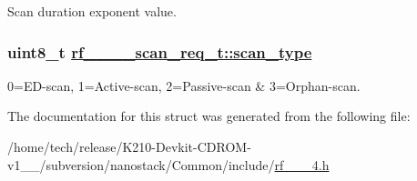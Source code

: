 Scan duration exponent value. \hypertarget{structrf__802__15__4__scan__req__t_a1bd396edfc7bc51c6eaf706c95180a1}{
\subsubsection[scan\_\-type]{\setlength{\rightskip}{0pt plus 5cm}uint8\_\-t \hyperlink{structrf__802__15__4__scan__req__t_a1bd396edfc7bc51c6eaf706c95180a1}{rf\_\_\_\_\-scan\_\-req\_\-t::scan\_\-type}}}
\label{structrf__802__15__4__scan__req__t_a1bd396edfc7bc51c6eaf706c95180a1}


0=ED-scan, 1=Active-scan, 2=Passive-scan \& 3=Orphan-scan. 

The documentation for this struct was generated from the following file:\begin{CompactItemize}
\item 
/home/tech/release/K210-Devkit-CDROM-v1\_\_/subversion/nanostack/Common/include/\hyperlink{rf__802__15__4_8h}{rf\_\_\_\-4.h}\end{CompactItemize}
